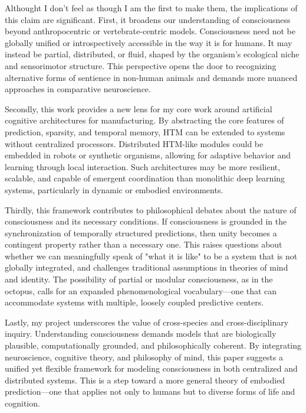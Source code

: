 \documentclass{article}
\begin{document}
Althought I don't feel as though I am the first to make them, the implications of this claim are significant. First, it broadens our understanding of consciousness beyond anthropocentric or vertebrate-centric models. Consciousness need not be globally unified or introspectively accessible in the way it is for humans. It may instead be partial, distributed, or fluid, shaped by the organism's ecological niche and sensorimotor structure. This perspective opens the door to recognizing alternative forms of sentience in non-human animals and demands more nuanced approaches in comparative neuroscience.

Secondly, this work provides a new lens for my core work around artificial cognitive architectures for manufacturing. By abstracting the core features of prediction, sparsity, and temporal memory, HTM can be extended to systems without centralized processors. Distributed HTM-like modules could be embedded in robots or synthetic organisms, allowing for adaptive behavior and learning through local interaction. Such architectures may be more resilient, scalable, and capable of emergent coordination than monolithic deep learning systems, particularly in dynamic or embodied environments.

Thirdly, this framework contributes to philosophical debates about the nature of consciousness and its necessary conditions. If consciousness is grounded in the synchronization of temporally structured predictions, then unity becomes a contingent property rather than a necessary one. This raises questions about whether we can meaningfully speak of "what it is like" to be a system that is not globally integrated, and challenges traditional assumptions in theories of mind and identity. The possibility of partial or modular consciousness, as in the octopus, calls for an expanded phenomenological vocabulary—one that can accommodate systems with multiple, loosely coupled predictive centers.

Lastly, my project underscores the value of cross-species and cross-disciplinary inquiry. Understanding consciousness demands models that are biologically plausible, computationally grounded, and philosophically coherent. By integrating neuroscience, cognitive theory, and philosophy of mind, this paper suggests a unified yet flexible framework for modeling consciousness in both centralized and distributed systems. This is a step toward a more general theory of embodied prediction—one that applies not only to humans but to diverse forms of life and cognition.
\newpage
\printbibliography
\end{document}
